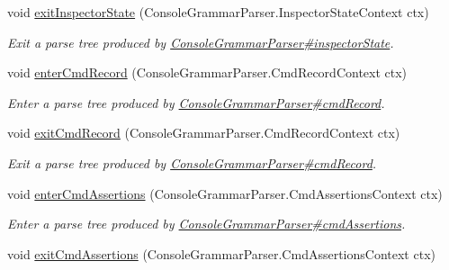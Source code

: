 \begin{DoxyCompactItemize}
void \hyperlink{interfacegov_1_1nasa_1_1jpf_1_1inspector_1_1client_1_1parser_1_1_console_grammar_listener_ac8c47a860344ab2f14c14de71e141748}{exit\+Inspector\+State} (Console\+Grammar\+Parser.\+Inspector\+State\+Context ctx)
\begin{DoxyCompactList}\small\item\em Exit a parse tree produced by \hyperlink{classgov_1_1nasa_1_1jpf_1_1inspector_1_1client_1_1parser_1_1_console_grammar_parser_ab57ca165e59675ed40c9b04da3c7d569}{Console\+Grammar\+Parser\#inspector\+State}. \end{DoxyCompactList}\item 
void \hyperlink{interfacegov_1_1nasa_1_1jpf_1_1inspector_1_1client_1_1parser_1_1_console_grammar_listener_aedf029d02f32d2ae5cbfc873aa735ee3}{enter\+Cmd\+Record} (Console\+Grammar\+Parser.\+Cmd\+Record\+Context ctx)
\begin{DoxyCompactList}\small\item\em Enter a parse tree produced by \hyperlink{classgov_1_1nasa_1_1jpf_1_1inspector_1_1client_1_1parser_1_1_console_grammar_parser_a9e1ec461862baeda7056c017c959cd7d}{Console\+Grammar\+Parser\#cmd\+Record}. \end{DoxyCompactList}\item 
void \hyperlink{interfacegov_1_1nasa_1_1jpf_1_1inspector_1_1client_1_1parser_1_1_console_grammar_listener_af413be98d6c29b05bb7247b51ea2f78f}{exit\+Cmd\+Record} (Console\+Grammar\+Parser.\+Cmd\+Record\+Context ctx)
\begin{DoxyCompactList}\small\item\em Exit a parse tree produced by \hyperlink{classgov_1_1nasa_1_1jpf_1_1inspector_1_1client_1_1parser_1_1_console_grammar_parser_a9e1ec461862baeda7056c017c959cd7d}{Console\+Grammar\+Parser\#cmd\+Record}. \end{DoxyCompactList}\item 
void \hyperlink{interfacegov_1_1nasa_1_1jpf_1_1inspector_1_1client_1_1parser_1_1_console_grammar_listener_a03c0b882b4478ca017276d100c73102d}{enter\+Cmd\+Assertions} (Console\+Grammar\+Parser.\+Cmd\+Assertions\+Context ctx)
\begin{DoxyCompactList}\small\item\em Enter a parse tree produced by \hyperlink{classgov_1_1nasa_1_1jpf_1_1inspector_1_1client_1_1parser_1_1_console_grammar_parser_aad29008053f0b40d17bf6e3e929b9b11}{Console\+Grammar\+Parser\#cmd\+Assertions}. \end{DoxyCompactList}\item 
void \hyperlink{interfacegov_1_1nasa_1_1jpf_1_1inspector_1_1client_1_1parser_1_1_console_grammar_listener_ae3d9f1ca9bd2cfe9d5f737938d45451d}{exit\+Cmd\+Assertions} (Console\+Grammar\+Parser.\+Cmd\+Assertions\+Context ctx)

\end{DoxyCompactItemize}
